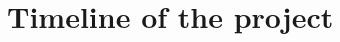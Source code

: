 \documentclass[11pt]{report}
\begin{document}
\chapter{Timeline of the project}

\newpage






\newpage
\setcounter{chapter}{9}
% 
% 
% 
\printbibliography

\appendix

\end{document}
